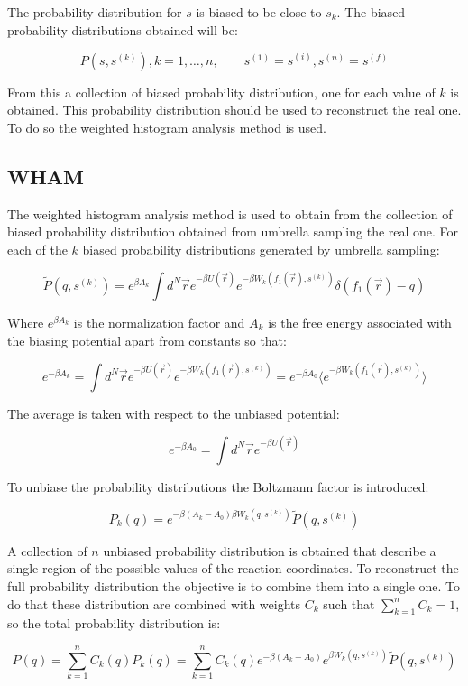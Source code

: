	The probability distribution for $s$ is biased to be close to $s_k$.
	The biased probability distributions obtained will be:

	$$P(s, s^{(k)}), k= 1, \dots, n,\qquad s^{(1)}=s^{(i)}, s^{(n)}=s^{(f)}$$

	From this a collection of biased probability distribution, one for each value of $k$ is obtained.
	This probability distribution should be used to reconstruct the real one.
	To do so the weighted histogram analysis method is used.

	\subsection{WHAM}
	The weighted histogram analysis method is used to obtain from the collection of biased probability distribution obtained from umbrella sampling the real one.
	For each of the $k$ biased probability distributions generated by umbrella sampling:

	$$\tilde{P}(q, s^{(k)}) = e^{\beta A_k}\int d^N\vec{r}e^{-\beta U(\vec{r})}e^{-\beta W_k(f_1(\vec{r}), s^{(k)})}\delta(f_1(\vec{r})-q)$$

	Where $e^{\beta A_k}$ is the normalization factor and $A_k$ is the free energy associated with the biasing potential apart from constants so that:

	$$e^{-\beta A_k} = \int d^N\vec{r}e^{-\beta U(\vec{r})}e^{-\beta W_k(f_1(\vec{r}), s^{(k)})}=e^{-\beta A_0}\biggl\langle e^{-\beta W_k(f_1(\vec{r}), s^{(k)})}\biggr\rangle$$

	The average is taken with respect to the unbiased potential:

	$$e^{-\beta A_0} = \int d^N\vec{r}e^{-\beta U(\vec{r})}$$

	To unbiase the probability distributions the Boltzmann factor is introduced:

	$$P_k(q) = e^{-\beta(A_k-A_0)\beta W_k(q, s^{(k)})}\tilde{P}(q, s^{(k)})$$

	A collection of $n$ unbiased probability distribution is obtained that describe a single region of the possible values of the reaction coordinates.
	To reconstruct the full probability distribution the objective is to combine them into a single one.
	To do that these distribution are combined with weights $C_k$ such that $\sum\limits_{k=1}^n C_k=1$, so the total probability distribution is:

	$$P(q) = \sum\limits_{k=1}^n C_k(q)P_k(q) = \sum\limits_{k=1}^nC_k(q)e^{-\beta(A_k-A_0)}e^{\beta W_k(q, s^{(k)})}\tilde{P}(q, s^{(k)})$$

